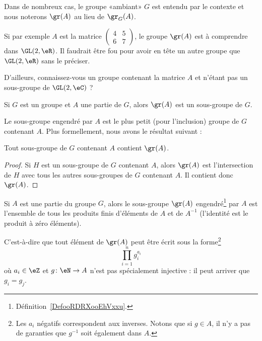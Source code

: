\begin{normaltext}
	Dans de nombreux cas, le groupe «ambiant» \( G\) est entendu par le contexte et nous noterons \( \gr(A)\) au lieu de \( \gr_G(A)\).

	Si par exemple \( A\) est la matrice \( \begin{pmatrix}
		4 & 5 \\
		6 & 7
	\end{pmatrix}\), le groupe \( \gr(A)\) est à comprendre dans \( \GL(2,\eR)\). Il faudrait être fou pour avoir en tête un autre groupe que \( \GL(2,\eR)\) sans le préciser.

	D'ailleurs, connaissez-vous un groupe contenant la matrice \( A\) et n'étant pas un sous-groupe de \( \GL(2,\eC)\) ?
\end{normaltext}

\begin{lemma}
	Si \( G\) est un groupe et \( A\) une partie de \( G\), alors \( \gr(A)\) est un sous-groupe de \( G\).
\end{lemma}

Le sous-groupe engendré par \( A \) est le plus petit (pour l'inclusion) groupe de \( G\) contenant \( A\). Plus formellement, nous avons le résultat suivant :
\begin{lemma}
	Tout sous-groupe de \( G\) contenant \( A\) contient \( \gr(A)\).
\end{lemma}

\begin{proof}
	Si \( H\) est un sous-groupe de \( G\) contenant \( A\), alors \( \gr(A)\) est l'intersection de \( H\) avec tous les autres sous-groupes de \( G\) contenant \( A\). Il contient donc \( \gr(A)\).
\end{proof}

\begin{lemma}   \label{LemFUIZooBZTCiy}
	Si \( A\) est une partie du groupe \( G\), alors le sous-groupe \( \gr(A)\) engendré\footnote{Définition~\ref{DefooRDRXooEhVxxu}.} par \( A\) est l'ensemble de tous les produits finis d'éléments de \( A\) et de \( A^{-1}\) (l'identité est le produit à zéro éléments).

	C'est-à-dire que tout élément de \( \gr(A)\) peut être écrit sous la forme\footnote{Les \( a_i\) négatifs correspondent aux inverses. Notons que si \( g\in A\), il n'y a pas de garanties que \( g^{-1}\) soit également dans \( A\).}
	\begin{equation}
		\prod_{i=1}^ng_i^{a_i}
	\end{equation}
	où \( a_i\in \eZ\) et \( g\colon \eN\to A\) n'est pas spécialement injective : il peut arriver que \( g_i=g_j\).
\end{lemma}

